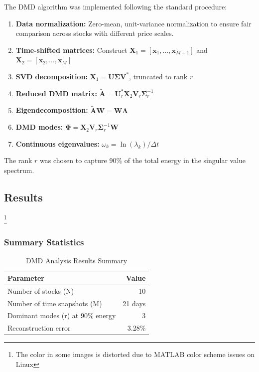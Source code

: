 \documentclass[12pt,a4paper]{article}
\begin{document}
The DMD algorithm was implemented following the standard procedure:

\begin{enumerate}
    \item \textbf{Data normalization:} Zero-mean, unit-variance normalization to ensure fair comparison across stocks with different price scales.
    
    \item \textbf{Time-shifted matrices:} Construct $\mathbf{X}_1 = [\mathbf{x}_1, \ldots, \mathbf{x}_{M-1}]$ and $\mathbf{X}_2 = [\mathbf{x}_2, \ldots, \mathbf{x}_M]$
    
    \item \textbf{SVD decomposition:} $\mathbf{X}_1 = \mathbf{U}\boldsymbol{\Sigma}\mathbf{V}^*$, truncated to rank $r$
    
    \item \textbf{Reduced DMD matrix:} $\tilde{\mathbf{A}} = \mathbf{U}_r^* \mathbf{X}_2 \mathbf{V}_r \boldsymbol{\Sigma}_r^{-1}$
    
    \item \textbf{Eigendecomposition:} $\tilde{\mathbf{A}}\mathbf{W} = \mathbf{W}\boldsymbol{\Lambda}$
    
    \item \textbf{DMD modes:} $\boldsymbol{\Phi} = \mathbf{X}_2 \mathbf{V}_r \boldsymbol{\Sigma}_r^{-1} \mathbf{W}$
    
    \item \textbf{Continuous eigenvalues:} $\omega_k = \ln(\lambda_k)/\Delta t$
\end{enumerate}

The rank $r$ was chosen to capture 90\% of the total energy in the singular value spectrum.

\subsection{Results}\footnote{The color in some images is distorted due to MATLAB color scheme issues on Linux}

\subsubsection{Summary Statistics}

\begin{table}[H]
\centering
\caption{DMD Analysis Results Summary}
\label{tab:summary}
\begin{tabular}{@{}lr@{}}
\toprule
\textbf{Parameter} & \textbf{Value} \\
\midrule
Number of stocks (N) & 10 \\
Number of time snapshots (M) & 21 days \\
Dominant modes (r) at 90\% energy & 3 \\
Reconstruction error & 3.28\% \\
\bottomrule
\end{tabular}
\end{table}
\end{document}
